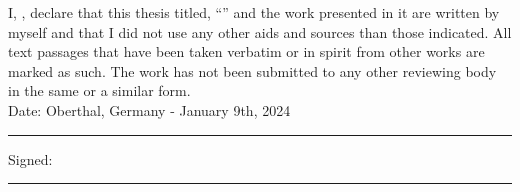 \documentclass[
11pt, %
english, %
singlespacing, %
headsepline, %
]{MastersDoctoralThesis} %
\begin{document}

\begin{declaration}
\addchaptertocentry{\authorshipname} %
\noindent I, \authorname, declare that this thesis titled, \enquote{\ttitle} and the work presented in it are written 
by myself and that I did not use any other aids and sources than those indicated. All text passages that have been 
taken verbatim or in spirit from other works are marked as such. The work has not been submitted to any other reviewing 
body in the same or a similar form.
\\

\noindent Date: Oberthal, Germany - January 9th, 2024\\
\rule[0.5em]{25em}{0.5pt}

\noindent Signed:\\
\rule[0.5em]{25em}{0.5pt}\\
\noindent {\authorname}\\

\end{declaration}

\cleardoublepage

\end{document}
